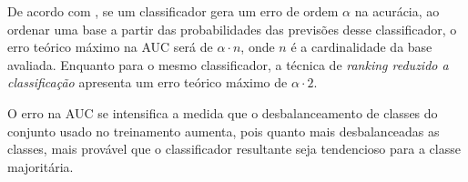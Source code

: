De acordo com \cite{langford08}, se um classificador gera um erro de ordem $\alpha$ na acurácia, ao ordenar uma base a partir das probabilidades das previsões desse classificador, o erro teórico máximo na AUC será de $\alpha \cdot n$, onde $n$ é a cardinalidade da base avaliada. Enquanto para o mesmo classificador, a técnica de \emph{ranking reduzido a classificação} apresenta um erro teórico máximo de $\alpha \cdot 2$.

O erro na AUC se intensifica a medida que o desbalanceamento de classes do conjunto usado no treinamento aumenta, pois quanto mais desbalanceadas as classes, mais provável que o classificador resultante seja tendencioso para a classe majoritária.